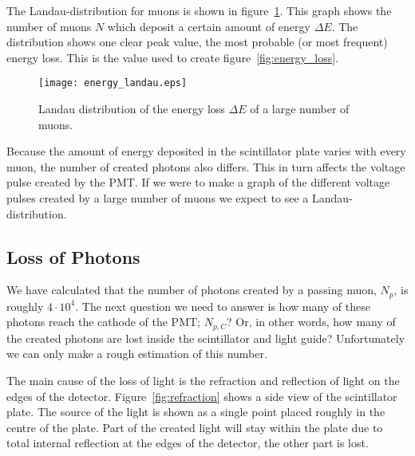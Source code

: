 The Landau-distribution for muons is shown in figure~\ref{fig:energy_landau}. This graph shows the number of muons $N$ which deposit a certain amount of energy $\Delta E$. The distribution shows one clear peak value, the most probable (or most frequent) energy loss. This is the value used to create figure~\ref{fig:energy_loss}.

\begin{figure}[b]\begin{center}
\texttt{[image: energy\_landau.eps]}%
\caption{Landau distribution of the energy loss $\Delta E$ of a large number of muons.}\label{fig:energy_landau}
\end{center}\end{figure}

Because the amount of energy deposited in the scintillator plate varies with every muon, the number of created photons also differs. This in turn affects the voltage pulse created by the PMT. If we were to make a graph of the different voltage pulses created by a large number of muons we expect to see a Landau-distribution.

\subsection{Loss of Photons}
We have calculated that the number of photons created by a passing muon, $N_p$, is roughly $4 \cdot 10^4$. The next question we need to answer is how many of these photons reach the cathode of the PMT; $N_{p,C}$? Or, in other words, how many of the created photons are lost inside the scintillator and light guide? Unfortunately we can only make a rough estimation of this number.

The main cause of the loss of light is the refraction and reflection of light on the edges of the detector. Figure~\ref{fig:refraction} shows a side view of the scintillator plate. The source of the light is shown as a single point placed roughly in the centre of the plate. Part of the created light will stay within the plate due to total internal reflection at the edges of the detector, the other part is lost.

